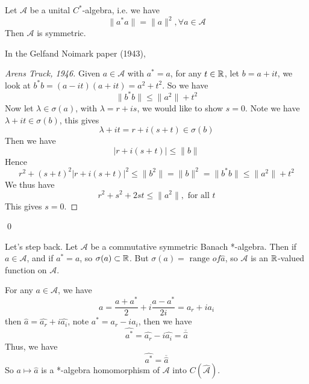 \begin{proposition}
    Let $\mathcal{A}$ be a unital $C^*$-algebra, i.e. we have
    \begin{equation*}
        \|a^*a\|=\|a\|^2, \forall a\in\mathcal{A}
    \end{equation*}
    Then $\mathcal{A}$ is symmetric.
\end{proposition}
In the Gelfand Noimark paper (1943), 
\begin{proof}[Arens Truck, 1946]
    Given $a\in\mathcal{A}$ with $a^*=a$, for any $t\in\mathbb{R}$, let $b=a+it$, we look at $b^*b=(a-it)(a+it)=a^2+t^2$. So we have
    \begin{equation*}
        \|b^*b\|\leq\|a^2\|+t^2
    \end{equation*}
    Now let $\lambda\in\sigma(a)$, with $\lambda=r+is$, we would like to show $s=0$. Note we have $\lambda+it\in\sigma(b)$, this gives
    \begin{equation*}
        \lambda+it=r+i(s+t)\in\sigma(b)
    \end{equation*}
    Then we have
    \begin{equation*}
        |r+i(s+t)|\leq\|b\|
    \end{equation*}
    Hence
    \begin{equation*}
        r^2+(s+t)^2|r+i(s+t)|^2\leq\|b^2\|=\|b\|^2=\|b^*b\|\leq\|a^2\|+t^2
    \end{equation*}
    We thus have
    \begin{equation*}
        r^2+s^2+2st\leq\|a^2\|, \text{ for all } t
    \end{equation*}
    This gives $s=0$.
\end{proof}
\qed

Let's step back. Let $\mathcal{A}$ be a commutative symmetric Banach *-algebra. Then if $a\in\mathcal{A}$, and if $a^*=a$, so $\sigma(a)\subset\mathbb{R}$. But $\sigma(a)=\text{ range } of \widehat{a}$, so $\mathcal{A}$ is an $\mathbb{R}$-valued function on $\mathcal{A}$.

For any $a\in\mathcal{A}$, we have
\begin{equation*}
    a=\frac{a+a^*}{2}+i\frac{a-a^*}{2i}=a_r+ia_i
\end{equation*}
then $\widehat{a}=\widehat{a_r}+i\widehat{a_i}$, note $a^*=a_r-ia_i$, then we have
\begin{equation*}
    \widehat{a^*}=\widehat{a_r}-i\widehat{a_i}=\overline{\widehat{a}}
\end{equation*} 
Thus, we have
\begin{equation*}
    \widehat{a^*}=\overline{\widehat{a}}
\end{equation*}
So $a\mapsto\widehat{a}$ is a *-algebra homomorphism of $\mathcal{A}$ into $C(\widehat{\mathcal{A}})$.

